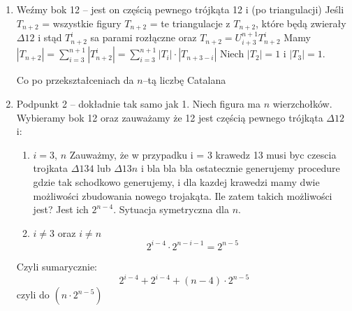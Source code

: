 \documentclass{mwbk}
\begin{document}
\begin{mdframed}
    \begin{enumerate}
        \item
              Weźmy bok 12 -- jest on częścią pewnego trójkąta 12 i (po triangulacji)
              Jeśli $T_{n+2}$ = wszystkie figury
              $T_{n+2}$ = te triangulacje z $T_{n+2}$, które będą zwierały $\Delta12$
              i stąd ${T_{n+2}^i}$ sa parami rozłączne oraz
              $T_{n+2} = U_{i+3}^{n+1}T_{n+2}^i$
              Mamy $|T_{n+2}| = \sum_{i = 3}^{n+1}|T_{n+2}^i| = \sum_{i = 3 }^{n+1}|T_i| \cdot |T_{n+3-i}|$
              Niech $|T_2| = 1$ i $|T_3| = 1$.

              Co po przekształceniach da $n$--tą liczbę Catalana


        \item
              Podpunkt 2 -- dokładnie tak samo jak 1.
              Niech figura ma $n$ wierzchołków.
              Wybieramy bok 12 oraz zauważamy że 12 jest częścią pewnego trójkąta $\Delta12$
              i:
              \begin{enumerate}
                  \item
                        $i = 3$, $n$
                        Zauważmy, że w przypadku i = 3 krawedz 13 musi byc
                        czescia trojkata $\Delta134$ lub $\Delta13n$ i bla bla bla ostatecznie generujemy procedure gdzie tak schodkowo generujemy, i dla kazdej krawedzi mamy dwie możliwości zbudowania nowego trojakąta.
                        Ile zatem takich możliwości jest? Jest ich $2^{n-4}$.
                        Sytuacja symetryczna dla $n$.
                  \item $i \neq 3$ oraz $i \neq n$
                        \[2^{i-4} \cdot 2^{n-i-1} = 2^{n-5} \]

              \end{enumerate}
              Czyli sumarycznie:
              \[ 2^{i-4} + 2^{i-4} + (n-4)\cdot 2^{n-5}\]
              czyli do $(n\cdot 2^{n-5})$

    \end{enumerate}

\end{mdframed}
\end{document}
